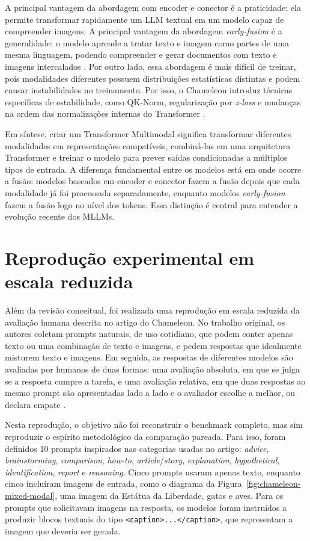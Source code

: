 \documentclass[a4paper,12pt]{article}
\begin{document}
A principal vantagem da abordagem com encoder e conector é a praticidade: ela permite transformar rapidamente um LLM textual em um modelo capaz de compreender imagens. A principal vantagem da abordagem \textit{early-fusion} é a generalidade: o modelo aprende a tratar texto e imagem como partes de uma mesma linguagem, podendo compreender e gerar documentos com texto e imagens intercalados \cite{chameleon2024}. Por outro lado, essa abordagem é mais difícil de treinar, pois modalidades diferentes possuem distribuições estatísticas distintas e podem causar instabilidades no treinamento. Por isso, o Chameleon introduz técnicas específicas de estabilidade, como QK-Norm, regularização por \textit{z-loss} e mudanças na ordem das normalizações internas do Transformer \cite{chameleon2024}.

Em síntese, criar um Transformer Multimodal significa transformar diferentes modalidades em representações compatíveis, combiná-las em uma arquitetura Transformer e treinar o modelo para prever saídas condicionadas a múltiplos tipos de entrada. A diferença fundamental entre os modelos está em onde ocorre a fusão: modelos baseados em encoder e conector fazem a fusão depois que cada modalidade já foi processada separadamente, enquanto modelos \textit{early-fusion} fazem a fusão logo no nível dos tokens. Essa distinção é central para entender a evolução recente dos MLLMs.

\section*{\textbf{Reprodução experimental em escala reduzida}}

Além da revisão conceitual, foi realizada uma reprodução em escala reduzida da avaliação humana descrita no artigo do Chameleon. No trabalho original, os autores coletam prompts naturais, de uso cotidiano, que podem conter apenas texto ou uma combinação de texto e imagens, e pedem respostas que idealmente misturem texto e imagens. Em seguida, as respostas de diferentes modelos são avaliadas por humanos de duas formas: uma avaliação absoluta, em que se julga se a resposta cumpre a tarefa, e uma avaliação relativa, em que duas respostas ao mesmo prompt são apresentadas lado a lado e o avaliador escolhe a melhor, ou declara empate \cite{chameleon2024}.

Nesta reprodução, o objetivo não foi reconstruir o benchmark completo, mas sim reproduzir o espírito metodológico da comparação pareada. Para isso, foram definidos 10 prompts inspirados nas categorias usadas no artigo: \textit{advice}, \textit{brainstorming}, \textit{comparison}, \textit{how-to}, \textit{article}/\textit{story}, \textit{explanation}, \textit{hypothetical}, \textit{identification}, \textit{report} e \textit{reasoning}. Cinco prompts usaram apenas texto, enquanto cinco incluíram imagens de entrada, como o diagrama da Figura~\ref{fig:chameleon-mixed-modal}, uma imagem da Estátua da Liberdade, gatos e aves. Para os prompts que solicitavam imagens na resposta, os modelos foram instruídos a produzir blocos textuais do tipo \texttt{<caption>...</caption>}, que representam a imagem que deveria ser gerada.
\end{document}
